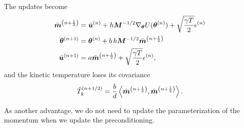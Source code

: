 \documentclass{article}
\begin{document}
{The updates become
\begin{align}
  \bar{{\bm{m}}}^{{\left( n+\frac{1}{2} \right)}} &= \bar{{\bm{u}}}^{{\left( n \right)}} + h{\bm{M}}^{-1/2}{\nabla_{\boldsymbol\theta} U({\boldsymbol\theta}^{{\left( n \right)}})} + \sqrt{\frac{\gamma T}{2}}\epsilon^{{\left( n \right)}} \\
  {\boldsymbol\theta}^{{\left( n+1 \right)}} &= {\boldsymbol\theta}^{{\left( n \right)}}+ b\, h {\bm{M}}^{-1/2} \bar{{\bm{m}}}^{{\left( n+\frac{1}{2} \right)}}\\
  \bar{{\bm{u}}}^{{\left( n+1 \right)}} &= a\bar{{\bm{m}}}^{{\left( n+\frac{1}{2} \right)}} + \sqrt{\frac{\gamma T}{2}}\epsilon^{{\left( n \right)}}, \\
\end{align}
and the kinetic temperature loses its covariance
\begin{equation}
  \hat{T}^{{\left( n+1/2 \right)}}_k = \frac{b}{d}\left\langle \bar{{\bm{m}}}^{{\left( n+\frac{1}{2} \right)}}, \bar{{\bm{m}}}^{{\left( n+\frac{1}{2} \right)}}\right\rangle.
\end{equation}

As another advantage, we do not need to update the parameterization of the
momentum when we update the preconditioning.

} %

\printbibliography
\end{document}
